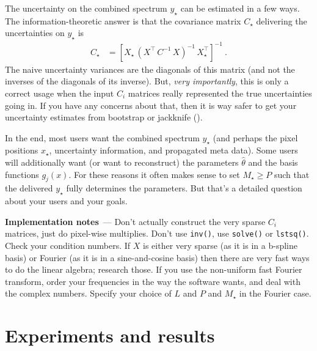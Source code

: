 \documentclass[modern]{aastex631}
\renewcommand{\paragraph}[1]{\medskip\par\noindent\textbf{#1}~---}
\begin{document}
The uncertainty on the combined spectrum $y_\star$ can be estimated in a few ways.
The information-theoretic answer is that the covariance matrix $C_\star$ delivering the uncertainties on $y_\star$ is
\begin{align}
    C_\star &= [X_\star\,(X^\top\,C^{-1}\,X)^{-1}\,X_\star^\top]^{-1} ~.
\end{align}
The naive uncertainty variances are the diagonals of this matrix (and not the inverses of the diagonals of its inverse).
But, \emph{very importantly}, this is only a correct usage when the input $C_i$ matrices really represented the true uncertainties going in.
If you have any concerns about that, then it is way safer to get your uncertainty estimates from bootstrap or jackknife (\citealt{fittingflexible}).

In the end, most users want the combined spectrum $y_\star$ (and perhaps the pixel positions $x_\star$, uncertainty information, and propagated meta data).
Some users will additionally want (or want to reconstruct) the parameters $\hat\theta$ and the basis functions $g_j(x)$.
For these reasons it often makes sense to set $M_\star\geq P$ such that the delivered $y_\star$ fully determines the parameters.
But that's a detailed question about your users and your goals.

\paragraph{Implementation notes}
Don't actually construct the very sparse $C_i$ matrices, just do pixel-wise multiplies.
Don't use \texttt{inv()}, use \texttt{solve()} or \texttt{lstsq()}.
Check your condition numbers.
If $X$ is either very sparse (as it is in a b-spline basis) or Fourier (as it is in a sine-and-cosine basis) then there are very fast ways to do the linear algebra; research those.
If you use the non-uniform fast Fourier transform, order your frequencies in the way the software wants, and deal with the complex numbers.
Specify your choice of $L$ and $P$ and $M_\star$ in the Fourier case.

\section{Experiments and results}\label{sec:results}
\end{document}
